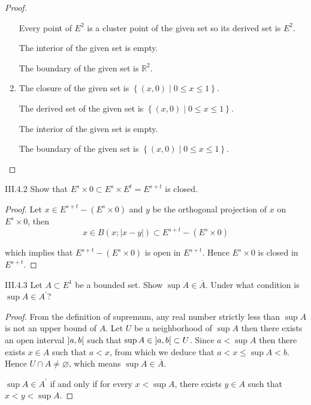 \begin{proof}
\begin{enumerate}[label={(\alph*)},itemsep=0pt]
		      Every point of \( E^{2} \) is a cluster point of the given set so its derived set is \( E^{2} \).

		      The interior of the given set is empty.

		      The boundary of the given set is \( \mathbb{R}^{2} \).
		\item The closure of the given set is \( \left\{ (x, 0) \mid 0 \le x \le 1 \right\} \).

		      The derived set of the given set is \( \left\{ (x, 0) \mid 0 \le x \le 1 \right\} \).

		      The interior of the given set is empty.

		      The boundary of the given set is \( \left\{ (x, 0) \mid 0 \le x \le 1 \right\} \).
	\end{enumerate}
\end{proof}

\begin{problem}{III.4.2}
Show that \( E^{s} \times 0 \subset E^{s} \times E^{t} = E^{s+t} \) is closed.
\end{problem}

\begin{proof}
	Let \( x \in E^{s+t} - (E^{s}\times 0) \) and \( y \) be the orthogonal projection of \( x \) on \( E^{s} \times 0 \), then
	\[
		x \in B(x; \left\vert x - y \right\vert) \subset E^{s+t} - (E^{s}\times 0)
	\]

	which implies that \( E^{s+t} - (E^{s}\times 0) \) is open in \( E^{s+t} \). Hence \( E^{s}\times 0 \) is closed in \( E^{s+t} \).
\end{proof}

\begin{problem}{III.4.3}
Let \( A \subset E^{1} \) be a bounded set. Show \( \sup A \in \overline{A} \). Under what condition is \( \sup A \in A^{\prime} \)\@?
\end{problem}

\begin{proof}
	From the definition of supremum, any real number strictly less than \( \sup A \) is not an upper bound of \( A \). Let \( U \) be a neighborhood of \( \sup A \) then there exists an open interval \( \left]{a, b}\right[ \) such that \( \sup A \in \left]{a, b}\right[ \subset U \). Since \( a < \sup A \) then there exists \( x \in A \) such that \( a < x \), from which we deduce that \( a < x \le \sup A < b \). Hence \( U \cap A \ne \varnothing \), which means \( \sup A \in \overline{A} \).

	\( \sup A \in A^{\prime} \) if and only if for every \( x < \sup A \), there exists \( y \in A \) such that \( x < y < \sup A \).
\end{proof}

